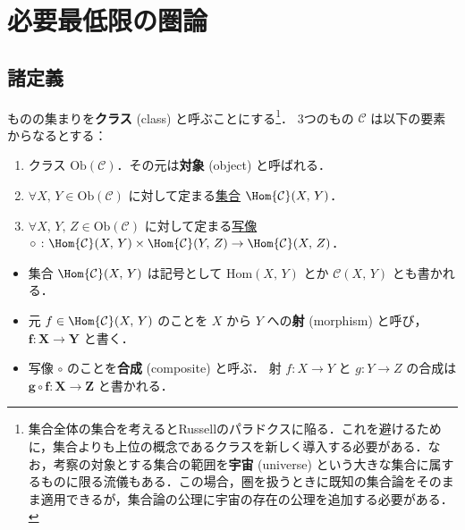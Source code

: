 \documentclass[algtopo_main]{subfiles}
\begin{document}

\chapter{必要最低限の圏論}


\section{諸定義}

ものの集まりを\textbf{クラス} (class) と呼ぶことにする\footnote{集合全体の集合を考えるとRussellのパラドクスに陥る．これを避けるために，集合よりも上位の概念であるクラスを新しく導入する必要がある．なお，考察の対象とする集合の範囲を\textbf{宇宙} (universe) という大きな集合に属するものに限る流儀もある．この場合，圏を扱うときに既知の集合論をそのまま適用できるが，集合論の公理に宇宙の存在の公理を追加する必要がある．}．
3つのもの $\mathcal{C}$ は以下の要素からなるとする：
\begin{enumerate}
    \item クラス $\mathrm{Ob}(\mathcal{C})$．その元は\textbf{対象} (object) と呼ばれる．
    \item $\forall X,\, Y \in \mathrm{Ob}(\mathcal{C})$ に対して定まる\underline{集合} $\Hom{\mathcal{C}}(X,\, Y)$．
    \item $\forall X,\, Y,\, Z \in \mathrm{Ob}(\mathcal{C})$ に対して定まる\underline{写像} $\circ\mathrel{} \colon \Hom{\mathcal{C}}(X,\, Y) \times \Hom{\mathcal{C}}(Y,\, Z) \to \Hom{\mathcal{C}}(X,\, Z)$．
\end{enumerate}

\begin{marker}
    \begin{itemize}
        \item 集合 $\Hom{\mathcal{C}}(X,\, Y)$ は記号として $\mathrm{Hom}(X,\, Y)$ とか $\mathcal{C}(X,\, Y)$ とも書かれる．
        \item 元 $f \in \Hom{\mathcal{C}}(X,\, Y)$ のことを $X$ から $Y$ への\textbf{射} (morphism) と呼び，$\bm{f \colon X \to Y}$ と書く．
        \item 写像 $\circ$ のことを\textbf{合成} (composite) と呼ぶ．
        射 $f \colon X \to Y$ と $g \colon Y \to Z$ の合成は $\bm{g \circ f \colon X \to Z}$ と書かれる．
    \end{itemize}
\end{marker}
\end{document}
